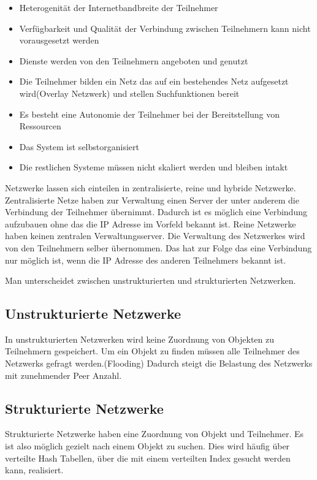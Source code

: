 \begin{itemize}
  \item Heterogenität der Internetbandbreite der Teilnehmer
  \item Verfügbarkeit und Qualität der Verbindung zwischen Teilnehmern kann nicht vorausgesetzt werden
  \item Dienste werden von den Teilnehmern angeboten und genutzt
  \item Die Teilnehmer bilden ein Netz das auf ein bestehendes Netz aufgesetzt wird(Overlay Netzwerk) und stellen Suchfunktionen bereit
  \item Es besteht eine Autonomie der Teilnehmer bei der Bereitstellung von Ressourcen
  \item Das System ist selbstorganisiert
  \item Die restlichen Systeme müssen nicht skaliert werden und bleiben intakt
\end{itemize}
\pTp Netzwerke lassen sich einteilen in zentralisierte, reine und hybride \pTp Netzwerke. Zentralisierte Netze haben zur Verwaltung einen Server der unter anderem die Verbindung der Teilnehmer übernimmt. Dadurch ist es möglich eine Verbindung aufzubauen ohne das die IP Adresse im Vorfeld bekannt ist. Reine \pTp Netzwerke haben keinen zentralen Verwaltungsserver. Die Verwaltung des Netzwerkes wird von den Teilnehmern selber übernommen. Das hat zur Folge das eine Verbindung nur möglich ist, wenn die IP Adresse des anderen Teilnehmers bekannt ist. 

Man unterscheidet zwischen unstrukturierten und strukturierten \pTp Netzwerken. 

\subsection{Unstrukturierte \pTp Netzwerke}
In unstrukturierten \pTp Netzwerken wird keine Zuordnung von Objekten zu Teilnehmern gespeichert. Um ein Objekt zu finden müssen alle Teilnehmer des Netzwerks gefragt werden.(Flooding) Dadurch steigt die Belastung des Netzwerks mit zunehmender Peer Anzahl.

\subsection{Strukturierte \pTp Netzwerke}
Strukturierte \pTp Netzwerke haben eine Zuordnung von Objekt und Teilnehmer. Es ist also möglich gezielt nach einem Objekt zu suchen. Dies wird häufig über verteilte Hash Tabellen, über die mit einem verteilten Index gesucht werden kann, realisiert.

